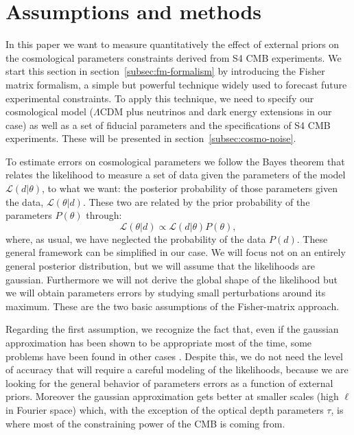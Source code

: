 \documentclass[aps,prd,reprint,superscriptaddress]{revtex4-1}
\newcommand{\refssec}[1]{section~\ref{subsec:#1}}
\begin{document}
\section{Assumptions and methods \label{sec:methods}}


In this paper we want to measure quantitatively the effect of external priors on the  cosmological parameters constraints derived from S4 CMB experiments.
We start this section in \refssec{fm-formalism} by introducing the Fisher matrix formalism, a simple but powerful technique widely used to forecast future experimental constraints. To apply this technique, we need to specify our cosmological model ($\Lambda$CDM plus neutrinos and dark energy extensions in our case) as well as a set of fiducial parameters and the specifications of S4 CMB experiments. These will be presented in \refssec{cosmo-noise}.

To estimate errors on cosmological parameters we follow the Bayes theorem that relates the likelihood to measure a set of data given the parameters of the model $\mathcal{L}(d|\theta)$, to what we want: the posterior probability of those parameters given the data, $\mathcal{L}(\theta|d)$.
These two are related by the prior probability of the parameters $P(\theta)$ through:
\begin{equation}
\mathcal{L}(\theta|d)\propto \mathcal{L}(d|\theta)P(\theta),
\end{equation}
where, as usual, we have neglected the probability of the data $P(d)$.
These general framework can be simplified in our case. We will focus not on an entirely general posterior distribution, but we will assume that the likelihoods are gaussian.
Furthermore we will not derive the global shape of the likelihood but we will obtain parameters errors by studying small perturbations around its maximum. These are the two basic assumptions of the Fisher-matrix approach.

Regarding the first assumption, we recognize the fact that, even if the gaussian approximation has been shown to be appropriate most of the time, some problems have been found in other cases \cite{2012JCAP...09..009W}. Despite this, we do not need the level of accuracy that will require a careful modeling of the likelihoods, because we are looking for the general behavior of parameters errors as a function of external priors.
Moreover the gaussian approximation gets better at smaller scales (high $\ell$ in Fourier space) which, with the exception of the optical depth parameters $\tau$, is where most of the constraining power of the CMB is coming from.
\end{document}
